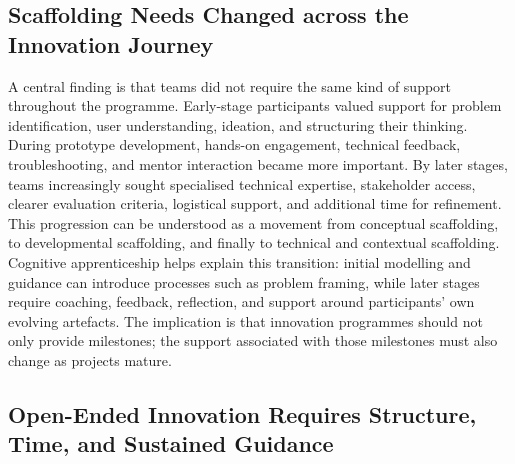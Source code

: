 \documentclass[runningheads]{llncs}
\begin{document}
\subsection{Scaffolding Needs Changed across the Innovation Journey}

A central finding is that teams did not require the same kind of support throughout the programme. Early-stage participants valued support for problem identification, user understanding, ideation, and structuring their thinking. During prototype development, hands-on engagement, technical feedback, troubleshooting, and mentor interaction became more important. By later stages, teams increasingly sought specialised technical expertise, stakeholder access, clearer evaluation criteria, logistical support, and additional time for refinement. This progression can be understood as a movement from conceptual scaffolding, to developmental scaffolding, and finally to technical and contextual scaffolding. Cognitive apprenticeship \cite{b36} helps explain this transition: initial modelling and guidance can introduce processes such as problem framing, while later stages require coaching, feedback, reflection, and support around participants’ own evolving artefacts. The implication is that innovation programmes should not only provide milestones; the support associated with those milestones must also change as projects mature.

\subsection{Open-Ended Innovation Requires Structure, Time, and Sustained Guidance}
\end{document}
